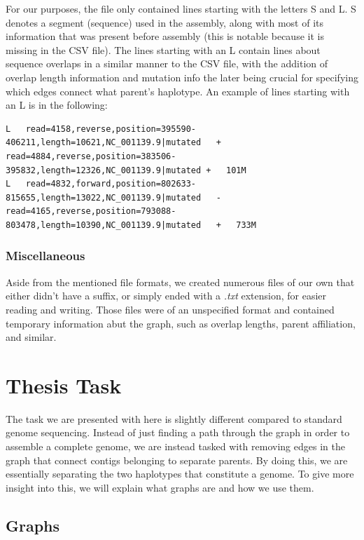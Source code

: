 \documentclass[times, utf8, diplomski, english]{fer_eng}
\begin{document}
For our purposes, the file only contained lines starting with the letters S and L. S denotes a segment (sequence) used in the assembly, along with most of its information that was present before assembly (this is notable because it is missing in the CSV file). The lines starting with an L contain lines about sequence overlaps in a similar manner to the CSV file, with the addition of overlap length information and mutation info the later being crucial for specifying which edges connect what parent's haplotype. An example of lines starting with an L is in the following:

\begin{lstlisting}
L	read=4158,reverse,position=395590-406211,length=10621,NC_001139.9|mutated	+ read=4884,reverse,position=383506-395832,length=12326,NC_001139.9|mutated	+	101M
L	read=4832,forward,position=802633-815655,length=13022,NC_001139.9|mutated	-	read=4165,reverse,position=793088-803478,length=10390,NC_001139.9|mutated	+	733M
\end{lstlisting}

\subsubsection{Miscellaneous}

Aside from the mentioned file formats, we created numerous files of our own that either didn't have a suffix, or simply ended with a \textit{.txt} extension, for easier reading and writing. Those files were of an unspecified format and contained temporary information abut the graph, such as overlap lengths, parent affiliation, and similar.

\section{Thesis Task}

The task we are presented with here is slightly different compared to standard genome sequencing. Instead of just finding a path through the graph in order to assemble a complete genome, we are instead tasked with removing edges in the graph that connect contigs belonging to separate parents. By doing this, we are essentially separating the two haplotypes that constitute a genome. To give more insight into this, we will explain what graphs are and how we use them.

\subsection{Graphs}
\end{document}
